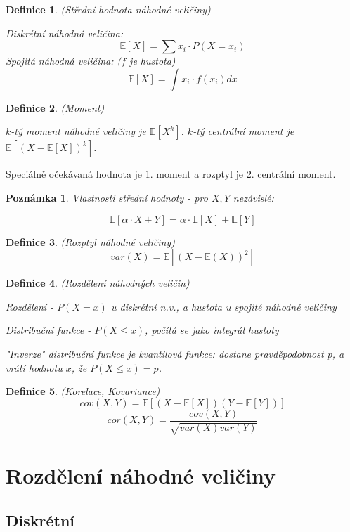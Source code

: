 \documentclass[a4paper,10pt,titlepage]{article} \usepackage[utf8]{inputenc}
\newtheorem{define}{Definice}
\newtheorem*{remark}{Poznámka}
\begin{document}
\begin{define}
(Střední hodnota náhodné veličiny)

Diskrétní náhodná veličina:
\[
	\mathbb{E}[X] = \sum x_i \cdot P(X = x_i)
\]
Spojitá náhodná veličina: ($f$ je hustota)
\[
	\mathbb{E}[X] = \int x_i \cdot f(x_i) dx
\]
\end{define}

\begin{define}
(Moment)

$k$-tý moment náhodné veličiny je $\mathbb{E}[X^k]$.
$k$-tý centrální moment je $\mathbb{E}[(X-\mathbb{E}[X])^k]$.
\end{define}

Speciálně očekávaná hodnota je 1. moment a rozptyl je 2. centrální moment.

\begin{remark}
Vlastnosti střední hodnoty - pro $X,Y$ nezávislé:

\[
\mathbb{E}[\alpha \cdot X + Y] = \alpha \cdot \mathbb{E}[X] + \mathbb{E}[Y]
\]
\end{remark}

\begin{define}
(Rozptyl náhodné veličiny)
\[
	var(X) = \mathbb{E}[(X - \mathbb{E} (X))^2]
\]
\end{define}

\begin{define}
(Rozdělení náhodných veličin)

Rozdělení - $P(X = x)$ u diskrétní n.v., a hustota u spojité náhodné veličiny

Distribuční funkce - $P(X \leq x)$, počítá se jako integrál hustoty

"Inverze" distribuční funkce je kvantilová funkce: dostane pravděpodobnost $p$,
a vrátí hodnotu $x$, že $P(X\leq x)=p$.

\end{define}

\begin{define}
(Korelace, Kovariance)
\[
cov(X,Y) = \mathbb{E}[(X-\mathbb{E}[X])(Y-\mathbb{E}[Y])]
\]
\[
cor(X,Y) = \frac{cov(X,Y)}{\sqrt{var(X)var(Y)}}
\]
\end{define}

\section{Rozdělení náhodné veličiny}

\subsection{Diskrétní}
\end{document}
